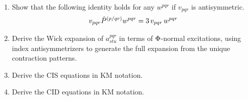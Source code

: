 \documentclass[11pt]{article}
\numberwithin{equation}{section}
\begin{document}
\begin{enumerate}
\item
  Show that the following identity holds for any $w^{pqr}$ if $v_{pqr}$ is antisymmetric.
  \begin{align*}
    v_{pqr}
    \hat{P}^{(p/qr)}
    w^{pqr}
  =
    3\,
    v_{pqr}\,
    w^{pqr}
  \end{align*}

\item
  Derive the Wick expansion of $a^{pqr}_{stu}$ in terms of $\Phi $-normal excitations, using index antisymmetrizers to generate the full expansion from the unique contraction patterns.

\item
  Derive the CIS equations in KM notation.

\item
  Derive the CID equations in KM notation.
\end{enumerate}
\end{document}
